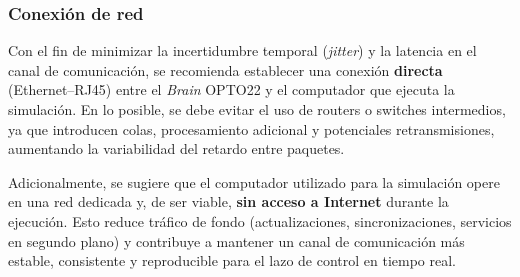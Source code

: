 \subsubsection{Conexión de red}
Con el fin de minimizar la incertidumbre temporal (\emph{jitter}) y la latencia en el canal de comunicación, se recomienda establecer una conexión \textbf{directa} (Ethernet--RJ45) entre el \emph{Brain} OPTO22 y el computador que ejecuta la simulación. En lo posible, se debe evitar el uso de routers o switches intermedios, ya que introducen colas, procesamiento adicional y potenciales retransmisiones, aumentando la variabilidad del retardo entre paquetes.

Adicionalmente, se sugiere que el computador utilizado para la simulación opere en una red dedicada y, de ser viable, \textbf{sin acceso a Internet} durante la ejecución. Esto reduce tráfico de fondo (actualizaciones, sincronizaciones, servicios en segundo plano) y contribuye a mantener un canal de comunicación más estable, consistente y reproducible para el lazo de control en tiempo real.
